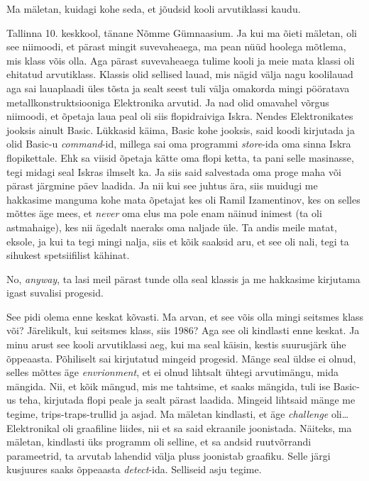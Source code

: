 
                 

Ma mäletan, kuidagi kohe seda, et jõudsid kooli arvutiklassi kaudu.


Tallinna 10. keskkool, tänane Nõmme 
Gümnaasium. Ja kui ma 
õieti mäletan, oli see niimoodi, et  pärast mingit suvevaheaega, ma pean nüüd 
hoolega mõtlema, mis klass võis olla. Aga pärast suvevaheaega tulime kooli ja 
meie mata klassi oli ehitatud arvutiklass. Klassis olid sellised lauad, mis 
nägid välja nagu koolilauad aga sai lauaplaadi üles tõsta ja sealt seest tuli 
välja omakorda mingi  pööratava metallkonstruktsiooniga  
Elektronika arvutid. Ja nad olid omavahel võrgus 
niimoodi, et  õpetaja laua peal oli siis flopidraiviga 
Iskra. Nendes Elektronikates jooksis ainult Basic. 
Lükkasid käima, Basic kohe jooksis, said koodi 
kirjutada ja olid Basic-u \emph{command}-id, millega sai oma programmi \emph{store}-ida oma 
sinna Iskra flopikettale. Ehk sa viisid õpetaja kätte oma 
flopi ketta, ta pani selle masinasse, tegi midagi seal Iskras ilmselt ka. Ja 
siis said salvestada oma proge maha või pärast järgmine päev laadida. Ja nii 
kui see juhtus ära, siis muidugi me hakkasime manguma kohe mata õpetajat kes 
oli Ramil Izamentinov, kes on selles mõttes äge 
mees, et \emph{never} oma elus ma pole enam näinud inimest (ta oli astmahaige), 
kes nii ägedalt naeraks oma naljade üle. Ta andis meile matat, eksole, ja kui 
ta tegi mingi nalja, siis et kõik saaksid aru, et see oli nali, tegi ta sihukest 
spetsiifilist kähinat. 

No, \emph{anyway}, ta lasi meil pärast tunde olla seal klassis ja me 
hakkasime kirjutama igast suvalisi progesid. 


See pidi olema enne keskat kõvasti. Ma arvan, et see võis olla mingi seitsmes 
klass või? Järelikult, kui seitsmes klass, siis 1986? Aga see oli kindlasti 
enne keskat. Ja minu arust see kooli arvutiklassi aeg, kui ma seal käisin, 
kestis suurusjärk ühe õppeaasta. Põhiliselt sai kirjutatud mingeid progesid. 
Mänge seal üldse ei olnud, selles mõttes äge \emph{envrionment}, et  
ei olnud lihtsalt ühtegi arvutimängu, mida mängida. Nii, et kõik mängud, mis me 
tahtsime, et saaks mängida, tuli ise Basic-us teha, 
 kirjutada flopi peale ja sealt pärast laadida. Mingeid 
lihtsaid mänge me tegime, trips-traps-trullid ja asjad. Ma mäletan kindlasti, 
et äge \emph{challenge} oli\ldots Elektronikal  oli graafiline liides, nii et 
sa said ekraanile joonistada. Näiteks, ma mäletan, kindlasti üks programm oli 
selline, et sa andsid ruutvõrrandi parameetrid, ta arvutab lahendid välja pluss joonistab 
graafiku. Selle järgi kusjuures saaks õppeaasta \emph{detect}-ida. Selliseid asju 
tegime. 

